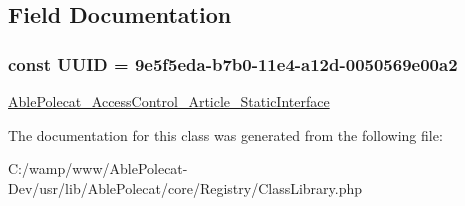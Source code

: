 \subsection{Field Documentation}
\hypertarget{class_able_polecat___registry___class_library_a74b892c8c0b86bf9d04c5819898c51e7}{}
\subsubsection[{U\+U\+I\+D}]{\setlength{\rightskip}{0pt plus 5cm}const U\+U\+I\+D = \textquotesingle{}9e5f5eda-\/b7b0-\/11e4-\/a12d-\/0050569e00a2\textquotesingle{}}\label{class_able_polecat___registry___class_library_a74b892c8c0b86bf9d04c5819898c51e7}
\hyperlink{interface_able_polecat___access_control___article___static_interface}{Able\+Polecat\+\_\+\+Access\+Control\+\_\+\+Article\+\_\+\+Static\+Interface} 

The documentation for this class was generated from the following file\+:\begin{DoxyCompactItemize}
\item 
C\+:/wamp/www/\+Able\+Polecat-\/\+Dev/usr/lib/\+Able\+Polecat/core/\+Registry/Class\+Library.\+php\end{DoxyCompactItemize}
